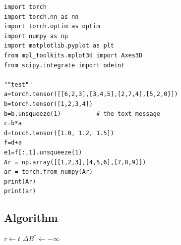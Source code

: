 \begin{lstlisting}[style=python]
import torch
import torch.nn as nn
import torch.optim as optim
import numpy as np
import matplotlib.pyplot as plt
from mpl_toolkits.mplot3d import Axes3D
from scipy.integrate import odeint

""test""
a=torch.tensor([[6,2,3],[3,4,5],[2,7,4],[5,2,0]])
b=torch.tensor([1,2,3,4])
b=b.unsqueeze(1)          # the text message
c=b*a
d=torch.tensor([1.0, 1.2, 1.5])
f=d+a
e1=f[:,1].unsqueeze(1)
Ar = np.array([[1,2,3],[4,5,6],[7,8,9]])
ar = torch.from_numpy(Ar)
print(Ar)
print(ar)
\end{lstlisting}

\subsection{Algorithm}

\begin{algorithm}
\caption{Simulation-optimization heuristic}\label{algorithm}
$r\leftarrow t$\;
$\Delta B^{\ast}\leftarrow -\infty$\;
\end{algorithm}